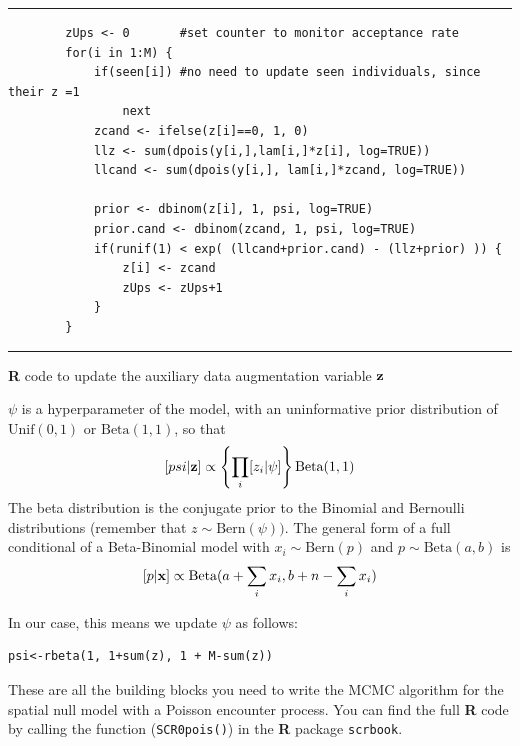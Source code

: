 \begin{panel}[htp]
\centering
\rule[0.15in]{\textwidth}{.03in}
{\small
\begin{verbatim}
        zUps <- 0		#set counter to monitor acceptance rate
        for(i in 1:M) {
            if(seen[i])	#no need to update seen individuals, since their z =1
                next
            zcand <- ifelse(z[i]==0, 1, 0)
            llz <- sum(dpois(y[i,],lam[i,]*z[i], log=TRUE))
            llcand <- sum(dpois(y[i,], lam[i,]*zcand, log=TRUE))

            prior <- dbinom(z[i], 1, psi, log=TRUE)
            prior.cand <- dbinom(zcand, 1, psi, log=TRUE)
            if(runif(1) < exp( (llcand+prior.cand) - (llz+prior) )) {
                z[i] <- zcand
                zUps <- zUps+1
            }
        }
\end{verbatim}
}
\rule[-0.15in]{\textwidth}{.03in}
\caption{
{\bf R} code to update the auxiliary data augmentation variable ${\bf z}$
}
\label{mcmc.panel.updatez}
\end{panel}


$\psi$
 is a hyperparameter of the model, with an uninformative prior 
 distribution of $\mbox{Unif}(0,1)$ or $\mbox{Beta}(1,1)$, so that
\[
[psi|{\bf z}] \propto \left\{ \prod_{i} [z_{i}|\psi] \right\} \mbox{Beta}(1,1)
\]
The beta distribution is the conjugate prior to the Binomial and 
Bernoulli distributions (remember that $z \sim \mbox{Bern}(\psi))$. 
The general form of a full conditional of a Beta-Binomial model 
with $x_{i} \sim \mbox{Bern} (p) $ and $p \sim \mbox{Beta}(a,b)$ is
\[
[p|{\bf x}] \propto \mbox{Beta}(a + \sum_i x_i, b + n-\sum_i x_i)
\]

In our case, this means we update $\psi$ as follows:
\begin{verbatim}
psi<-rbeta(1, 1+sum(z), 1 + M-sum(z))
\end{verbatim}

These are all the building blocks you need to write the MCMC algorithm
for the spatial null model with a Poisson encounter process.  You can
find the full {\bf R} code by calling the function (\mbox{\tt SCR0pois()}) in the {\bf R} package 
\mbox{\tt scrbook}.


